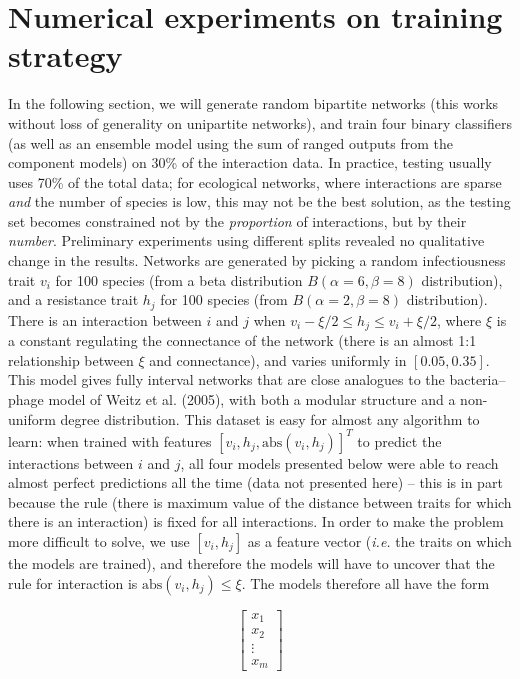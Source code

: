 \documentclass[10pt,oneside]{article}
\begin{document}
\hypertarget{numerical-experiments-on-training-strategy}{%
\section{Numerical experiments on training
strategy}\label{numerical-experiments-on-training-strategy}}

In the following section, we will generate random bipartite networks
(this works without loss of generality on unipartite networks), and
train four binary classifiers (as well as an ensemble model using the
sum of ranged outputs from the component models) on 30\% of the
interaction data. In practice, testing usually uses 70\% of the total
data; for ecological networks, where interactions are sparse \emph{and}
the number of species is low, this may not be the best solution, as the
testing set becomes constrained not by the \emph{proportion} of
interactions, but by their \emph{number}. Preliminary experiments using
different splits revealed no qualitative change in the results. Networks
are generated by picking a random infectiousness trait \(v_i\) for 100
species (from a beta distribution \(B(\alpha=6,\beta=8)\) distribution),
and a resistance trait \(h_j\) for 100 species (from
\(B(\alpha=2,\beta=8)\) distribution). There is an interaction between
\(i\) and \(j\) when \(v_i-\xi/2 \le h_j \le v_i+\xi/2\), where \(\xi\)
is a constant regulating the connectance of the network (there is an
almost 1:1 relationship between \(\xi\) and connectance), and varies
uniformly in \([0.05, 0.35]\). This model gives fully interval networks
that are close analogues to the bacteria--phage model of Weitz et al.
(2005), with both a modular structure and a non-uniform degree
distribution. This dataset is easy for almost any algorithm to learn:
when trained with features \([v_i, h_j, \text{abs}(v_i, h_j)] ^T\) to
predict the interactions between \(i\) and \(j\), all four models
presented below were able to reach almost perfect predictions all the
time (data not presented here) -- this is in part because the rule
(there is maximum value of the distance between traits for which there
is an interaction) is fixed for all interactions. In order to make the
problem more difficult to solve, we use \([v_i, h_j]\) as a feature
vector (\emph{i.e.} the traits on which the models are trained), and
therefore the models will have to uncover that the rule for interaction
is \(\text{abs}(v_i, h_j) \le \xi\). The models therefore all have the
form

\[
\begin{bmatrix}
           x_{1} \\
           x_{2} \\
           \vdots \\
           x_{m}
         \end{bmatrix}
\]
\end{document}
